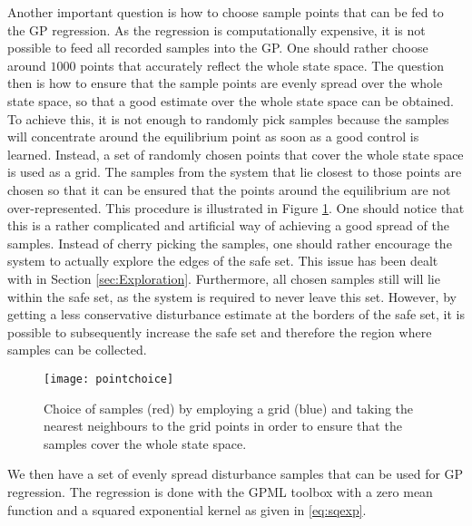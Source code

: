 \documentclass[../main.tex]{subfiles}
\begin{document}
Another important question is how to choose sample points that can be fed to the GP regression. As the regression is computationally expensive, it is not possible to feed all recorded samples into the GP. One should rather choose around $1000$ points that accurately reflect the whole state space. The question then is how to ensure that the sample points are evenly spread over the whole state space, so that a good estimate over the whole state space can be obtained. To achieve this, it is not enough to randomly pick samples because the samples will concentrate around the equilibrium point as soon as a good control is learned. Instead, a set of randomly chosen points that cover the whole state space is used as a grid. The samples from the system that lie closest to those points are chosen so that it can be ensured that the points around the equilibrium are not over-represented.  This procedure is illustrated in Figure \ref{fig:pointchoice}. One should notice that this is a rather complicated and artificial way of achieving a good spread of the samples. Instead of cherry picking the samples, one should rather encourage the system to actually explore the edges of the safe set. This issue has been dealt with in Section \ref{sec:Exploration}. Furthermore, all chosen samples still will lie within the safe set, as the system is required to never leave this set. However, by getting a less conservative disturbance estimate at the borders of the safe set, it is possible to subsequently increase the safe set and therefore the region where samples can be collected.

\begin{figure}
    \centering
    \texttt{[image: pointchoice]}
        \caption{Choice of samples (red) by employing a grid (blue) and taking the nearest neighbours to the grid points in order to ensure that the samples cover the whole state space.}  \label{fig:pointchoice}
\end{figure}

We then have a set of evenly spread disturbance samples that can be used for GP regression. The regression is done with the GPML toolbox \cite{Rasmussen:2010:GPM:1756006.1953029} with a zero mean function and a squared exponential kernel as given in \eqref{eq:sqexp}.
\end{document}
